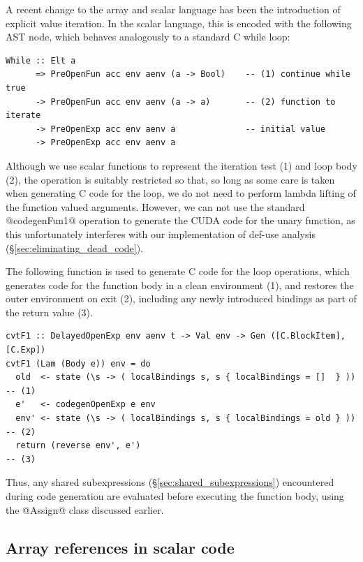 A recent change to the array and scalar language has been the introduction of
explicit value iteration. In the scalar language, this is encoded with the
following AST node, which behaves analogously to a standard C while loop:
%
\begin{lstlisting}[style=haskell]
While :: Elt a
      => PreOpenFun acc env aenv (a -> Bool)    -- (1) continue while true
      -> PreOpenFun acc env aenv (a -> a)       -- (2) function to iterate
      -> PreOpenExp acc env aenv a              -- initial value
      -> PreOpenExp acc env aenv a
\end{lstlisting}
%
Although we use scalar functions to represent the iteration test (1) and loop
body (2), the operation is suitably restricted so that, so long as some care is
taken when generating C code for the loop, we do not need to perform lambda
lifting of the function valued arguments. However, we can not use the standard
@codegenFun1@ operation to generate the CUDA code for the unary function,
as this unfortunately interferes with our implementation of def-use analysis
(\S\ref{sec:eliminating_dead_code}).

The following function is used to generate C code for the loop operations, which
generates code for the function body in a clean environment (1), and restores
the outer environment on exit (2), including any newly introduced bindings as
part of the return value (3).
%
\begin{lstlisting}[style=haskell]
cvtF1 :: DelayedOpenExp env aenv t -> Val env -> Gen ([C.BlockItem], [C.Exp])
cvtF1 (Lam (Body e)) env = do
  old  <- state (\s -> ( localBindings s, s { localBindings = []  } ))             -- (1)
  e'   <- codegenOpenExp e env
  env' <- state (\s -> ( localBindings s, s { localBindings = old } ))             -- (2)
  return (reverse env', e')                                                        -- (3)
\end{lstlisting}
%
Thus, any shared subexpressions (\S\ref{sec:shared_subexpressions}) encountered
during code generation are evaluated before executing the function body, using
the @Assign@ class discussed earlier.


\subsection{Array references in scalar code}

